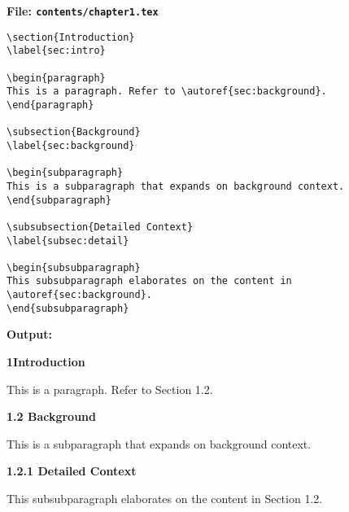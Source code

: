 \documentclass{VISTEC}
\begin{document}
\noindent\textbf{File: \texttt{contents/chapter1.tex}}\vspace{-1.5em}
\begin{verbatim}
\section{Introduction}
\label{sec:intro}

\begin{paragraph}
This is a paragraph. Refer to \autoref{sec:background}.
\end{paragraph}

\subsection{Background}
\label{sec:background}

\begin{subparagraph}
This is a subparagraph that expands on background context.
\end{subparagraph}

\subsubsection{Detailed Context}
\label{subsec:detail}

\begin{subsubparagraph}
This subsubparagraph elaborates on the content in \autoref{sec:background}.
\end{subsubparagraph}
\end{verbatim}

\newpage

\textbf{Output:}\vspace{0.5em}

\begin{tcolorbox}[colback=white, colframe=black, sharp corners, boxrule=0.4pt]

\textbf{1\hspace{1.1cm}Introduction}\vspace{6pt}

\hspace{1.25cm}This is a paragraph. Refer to Section 1.2.\vspace{6pt}

\hspace{1.25cm}\textbf{1.2 Background}\vspace{6pt}

\hspace{1.95cm}This is a subparagraph that expands on background context.\vspace{6pt}

\hspace{1.95cm}\textbf{1.2.1 Detailed Context}\vspace{6pt}

\hspace{2.95cm}This subsubparagraph elaborates on the content in Section 1.2.

\end{tcolorbox}
\end{document}
